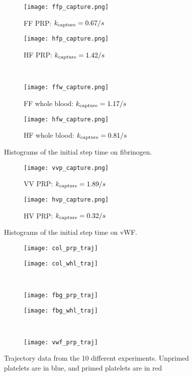 \documentclass{article}
\newcommand{\tn}{\textnormal}
\begin{document}
\begin{figure}
  \centering
  \begin{subfigure}{0.48\textwidth}
    \texttt{[image: ffp\_capture.png]}
    \caption{FF PRP: $k_\tn{capture} = 0.67 / s$}
  \end{subfigure}
  \hfill
  \begin{subfigure}{0.48\textwidth}
    \texttt{[image: hfp\_capture.png]}
    \caption{HF PRP: $k_\tn{capture} = 1.42 / s$}
  \end{subfigure}
  \\
  \begin{subfigure}{0.48\textwidth}
    \texttt{[image: ffw\_capture.png]}
    \caption{FF whole blood: $k_\tn{capture} = 1.17 / s$}
  \end{subfigure}
  \hfill
  \begin{subfigure}{0.48\textwidth}
    \texttt{[image: hfw\_capture.png]}
    \caption{HF whole blood: $k_\tn{capture} = 0.81 / s$}
  \end{subfigure}
  \caption{Histograms of the initial step time on fibrinogen.}
  \label{fig:fbg-capture}
\end{figure}

\begin{figure}
  \centering
  \begin{subfigure}{0.48\textwidth}
    \texttt{[image: vvp\_capture.png]}
    \caption{VV PRP: $k_\tn{capture} = 1.89 / s$}
  \end{subfigure}
  \hfill
  \begin{subfigure}{0.48\textwidth}
    \texttt{[image: hvp\_capture.png]}
    \caption{HV PRP: $k_\tn{capture} = 0.32 / s$}
  \end{subfigure}
  \caption{Histograms of the initial step time on vWF.}
  \label{fig:vwf-capture}
\end{figure}

\begin{figure}
  \centering
  \begin{subfigure}{0.48\textwidth}
    \texttt{[image: col\_prp\_traj]}
  \end{subfigure}
  \hfill
  \begin{subfigure}{0.48\textwidth}
    \texttt{[image: col\_whl\_traj]}
  \end{subfigure}
  \\
  \begin{subfigure}{0.48\textwidth}
    \texttt{[image: fbg\_prp\_traj]}
  \end{subfigure}
  \hfill
  \begin{subfigure}{0.48\textwidth}
    \texttt{[image: fbg\_whl\_traj]}
  \end{subfigure}
  \\
  \begin{subfigure}{0.48\textwidth}
    \texttt{[image: vwf\_prp\_traj]}
  \end{subfigure}
  \caption{Trajectory data from the 10 different experiments. Unprimed
    platelets are in blue, and primed platelets are in red}
  \label{fig:traj-plots}
\end{figure}

% 
% 
\end{document}
